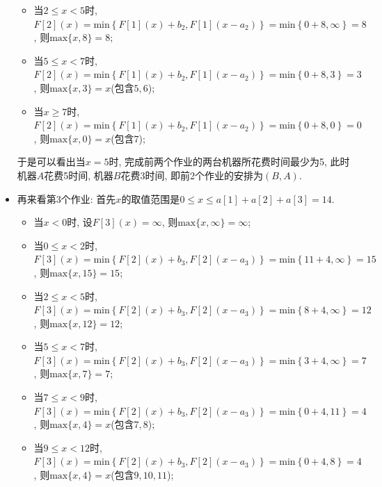 \documentclass{article}
\begin{document}
\begin{homeworkProblem}
\begin{itemize}
\begin{itemize}
			\item 当$2\leq x <5$时, $F\left[ 2 \right] \left( x \right) =\text{min} \left\{ F\left[ 1 \right] \left( x \right) +b_2,F\left[ 1 \right] \left( x-a_2 \right) \right\} =\text{min} \left\{ 0+8,\infty \right\} =8$, 则$\text{max}\{x,8\}=8$;
			\item 当$5\leq x <7$时, $F\left[ 2 \right] \left( x \right) =\text{min} \left\{ F\left[ 1 \right] \left( x \right) +b_2,F\left[ 1 \right] \left( x-a_2 \right) \right\} =\text{min} \left\{ 0+8,3 \right\} =3$, 则$\text{max}\{x,3\}=x$(包含$5,6$);
			\item 当$x\geq 7$时, $F\left[ 2 \right] \left( x \right) =\text{min} \left\{ F\left[ 1 \right] \left( x \right) +b_2,F\left[ 1 \right] \left( x-a_2 \right) \right\} =\text{min} \left\{ 0+8,0 \right\} =0$, 则$\text{max}\{x,0\}=x$(包含$7$);
		\end{itemize}
		于是可以看出当$x=5$时, 完成前两个作业的两台机器所花费时间最少为5, 此时机器$A$花费5时间, 机器$B$花费3时间, 即前2个作业的安排为$(B,A)$.
		\item 再来看第3个作业: 首先$x$的取值范围是$0\leq x\leq a[1]+a[2]+a[3]=14$.
		\begin{itemize}
			\item 当$x<0$时, 设$F[3](x)=\infty$, 则$\text{max}\{x,\infty\}=\infty$;
			\item 当$0\leq x<2$时, $F\left[ 3 \right] \left( x \right) =\text{min} \left\{ F\left[ 2 \right] \left( x \right) +b_3,F\left[ 2 \right] \left( x-a_3 \right) \right\} =\text{min} \left\{ 11+4,\infty \right\} =15$, 则$\text{max}\{x,15\}=15$;
			\item 当$2\leq x <5$时,$F\left[ 3 \right] \left( x \right) =\text{min} \left\{ F\left[ 2 \right] \left( x \right) +b_3,F\left[ 2 \right] \left( x-a_3 \right) \right\} =\text{min} \left\{ 8+4,\infty \right\} =12$, 则$\text{max}\{x,12\}=12$;
			\item 当$5\leq x<7$时, $F\left[ 3 \right] \left( x \right) =\text{min} \left\{ F\left[ 2 \right] \left( x \right) +b_3,F\left[ 2 \right] \left( x-a_3 \right) \right\} =\text{min} \left\{ 3+4,\infty \right\} =7$, 则$\text{max}\{x,7\}=7$;
			\item 当$7\leq x< 9$时, $F\left[ 3 \right] \left( x \right) =\text{min} \left\{ F\left[ 2 \right] \left( x \right) +b_3,F\left[ 2 \right] \left( x-a_3 \right) \right\} =\text{min} \left\{ 0+4,11 \right\} =4$, 则$\text{max}\{x,4\}=x$(包含$7,8$);
			\item 当$9\leq x< 12$时, $F\left[ 3 \right] \left( x \right) =\text{min} \left\{ F\left[ 2 \right] \left( x \right) +b_3,F\left[ 2 \right] \left( x-a_3 \right) \right\} =\text{min} \left\{ 0+4,8 \right\} =4$, 则$\text{max}\{x,4\}=x$(包含$9,10,11$);

\end{itemize}
\end{itemize}
\end{homeworkProblem}
\end{document}
